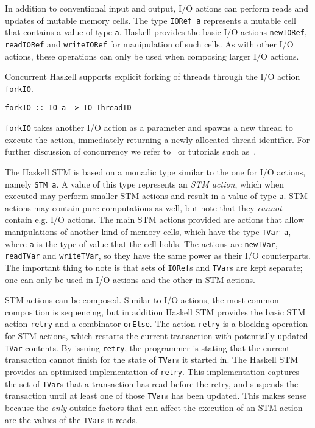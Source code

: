 In addition to conventional input and output, I/O actions can perform reads and updates of mutable memory
cells. The type \lstinline+IORef a+ represents a mutable cell that contains a value of type \lstinline+a+. 
Haskell provides the basic I/O actions \lstinline+newIORef+, \lstinline+readIORef+ and \lstinline+writeIORef+
for manipulation of such cells. As with other I/O actions, these operations can only be used when composing
larger I/O actions.

Concurrent Haskell supports explicit forking of threads through the I/O action \lstinline+forkIO+.
\begin{lstlisting}[style=small]
forkIO :: IO a -> IO ThreadID
\end{lstlisting}
\lstinline+forkIO+ takes another I/O action as a parameter and spawns a new thread to execute the action, 
immediately
returning a newly allocated thread identifier. For further discussion of concurrency we refer to~\cite{awkward}
or tutorials such as~\cite{partutorial}.

The Haskell STM is based on a monadic type similar to the one for I/O actions, namely \lstinline+STM a+.
A value of this type represents an {\em STM action}, which when executed may perform smaller STM actions and
result in a value of type \mbox{\lstinline+a+.} %
STM actions may contain pure computations as well, but note that
they {\em cannot} contain e.g. I/O actions. The main STM actions provided are actions that allow manipulations
of another kind of memory cells, which have the type \mbox{\lstinline+TVar a+}, %
where \lstinline+a+ is the type of
value that the cell holds. The actions are \lstinline+newTVar+, \lstinline+readTVar+ and \lstinline+writeTVar+,
so they have the same power as their I/O counterparts. The important thing to note is that sets of \lstinline+IORef+s
and \lstinline+TVar+s are kept separate; one can only be used in I/O actions and the other in STM actions.

STM actions can be composed. Similar to I/O actions, the most common composition is sequencing,
but in addition Haskell STM provides the basic STM action \lstinline+retry+ and a combinator
\lstinline+orElse+. The action \lstinline+retry+ is a blocking operation for 
STM actions, which restarts the current transaction with potentially updated \lstinline+TVar+ contents. 
By issuing \lstinline+retry+, the programmer is stating
that the current transaction cannot finish for the state of \lstinline+TVar+s it started in. 
The Haskell STM provides an optimized implementation of \lstinline+retry+. This implementation captures
the set of \lstinline+TVar+s that a transaction has read before the retry, and suspends the transaction
until at least one of those \lstinline+TVar+s has been updated.
This makes sense because the {\em only} outside factors that can
affect the execution of an STM action are the values of the \lstinline+TVar+s it reads.


